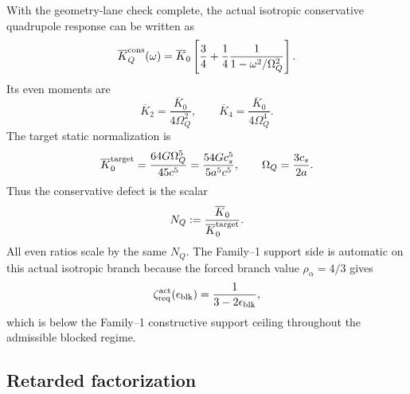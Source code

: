 With the geometry-lane check complete, the actual isotropic conservative quadrupole response can be written as
\begin{equation}
\label{eq:part04-kbar-cons}
\overline K_Q^{\rm cons}(\omega)
=
\overline K_0
\left[
\frac34+\frac14\frac{1}{1-\omega^2/\Omega_Q^2}
\right].
\end{equation}
Its even moments are
\begin{equation}
\label{eq:part04-kbar-even-moments}
\overline K_2=\frac{\overline K_0}{4\Omega_Q^2},
\qquad
\overline K_4=\frac{\overline K_0}{4\Omega_Q^4}.
\end{equation}
The target static normalization is
\begin{equation}
\label{eq:part04-kbar0-target}
\overline K_0^{\rm target}
=
\frac{64G\Omega_Q^5}{45c^5}
=
\frac{54G c_s^5}{5a^5c^5},
\qquad
\Omega_Q=\frac{3c_s}{2a}.
\end{equation}
Thus the conservative defect is the scalar
\begin{equation}
\label{eq:part04-NQ-def}
N_Q:=\frac{\overline K_0}{\overline K_0^{\rm target}}.
\end{equation}
All even ratios scale by the same \(N_Q\).  The Family--1 support side is automatic on this actual isotropic branch because the forced branch value \(\rho_\alpha=4/3\) gives
\begin{equation}
\label{eq:part04-blocked-zeta-req}
\zeta_{\rm req}^{\rm act}(\epsilon_{\rm blk})
=
\frac{1}{3-2\epsilon_{\rm blk}},
\end{equation}
which is below the Family--1 constructive support ceiling throughout the admissible blocked regime.

\subsection{Retarded factorization}
\label{subsec:part04-retarded-factorization}

